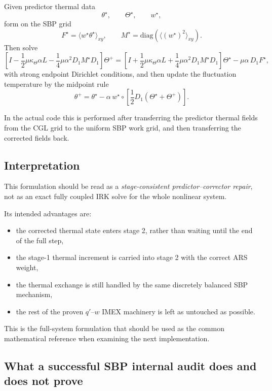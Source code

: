 \documentclass[11pt]{article}
\begin{document}
Given predictor thermal data
\[
\theta^\star,\qquad \Theta^\star,\qquad w^\star,
\]
form on the SBP grid
\[
F^\star = \langle w^\star \theta^\star \rangle_{xy},
\qquad
M^\star = \mathrm{diag}\!\left(\langle (w^\star)^2 \rangle_{xy}\right).
\]
Then solve
\begin{equation}
\left[
I
- \frac12 \mu \kappa_\Theta \alpha L
- \frac14 \mu \alpha^2 D_1 M^\star D_1
\right]\Theta^+
=
\left[
I
+ \frac12 \mu \kappa_\Theta \alpha L
+ \frac14 \mu \alpha^2 D_1 M^\star D_1
\right]\Theta^\star
- \mu \alpha\, D_1 F^\star,
\label{eq:pc-theta-mean}
\end{equation}
with strong endpoint Dirichlet conditions, and then update the fluctuation
temperature by the midpoint rule
\begin{equation}
\theta^+
=
\theta^\star
- \alpha\, w^\star \circ
\left[
\frac12 D_1(\Theta^\star + \Theta^+)
\right].
\label{eq:pc-theta-fluct}
\end{equation}

In the actual code this is performed after transferring the predictor thermal
fields from the CGL grid to the uniform SBP work grid, and then transferring
the corrected fields back.

\subsection{Interpretation}

This formulation should be read as a \emph{stage-consistent predictor--corrector
repair}, not as an exact fully coupled IRK solve for the whole nonlinear
system.

Its intended advantages are:
\begin{itemize}
\item the corrected thermal state enters stage 2, rather than waiting until the
  end of the full step,
\item the stage-1 thermal increment is carried into stage 2 with the correct
  ARS weight,
\item the thermal exchange is still handled by the same discretely balanced SBP
  mechanism,
\item the rest of the proven $q'$--$w$ IMEX machinery is left as untouched as
  possible.
\end{itemize}

This is the full-system formulation that should be used as the common
mathematical reference when examining the next implementation.

\subsection{What a successful SBP internal audit does and does not prove}
\end{document}
